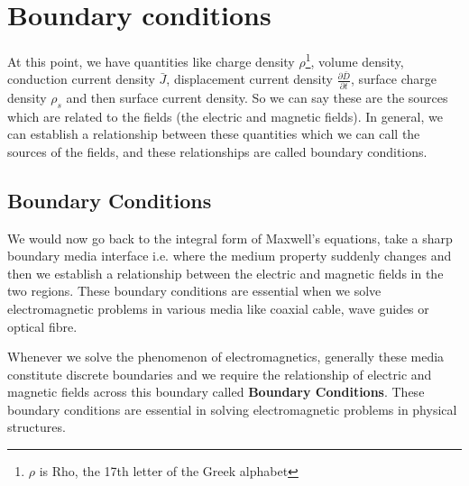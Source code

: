\chapter{Boundary conditions}\label{lec:lec20}

At this point, we have quantities like charge density $\rho$\footnote[1]{$\rho$ is Rho, the 17th letter of the Greek alphabet}, volume density, conduction current density $\bar{J}$, displacement current density $\frac{\partial \bar{D}}{\partial t}$, surface charge density $\rho_s$ and then surface current density. So we can say these are the sources which are related to the fields (the electric and magnetic fields). In general, we can establish a relationship between these quantities which we can call the sources of the fields, and these relationships are called boundary conditions.

\section{Boundary Conditions}

We would now go back to the integral form of Maxwell's equations, take a sharp boundary media interface i.e. where the medium property suddenly changes and then we establish a relationship between the electric and magnetic fields in the two regions. These boundary conditions are essential when we solve electromagnetic problems in various media like coaxial cable, wave guides or optical fibre.

Whenever we solve the phenomenon of electromagnetics, generally these media constitute discrete boundaries and we require the relationship of electric and magnetic fields across this boundary called \textbf{Boundary Conditions}. These boundary conditions are essential in solving electromagnetic problems in physical structures.

